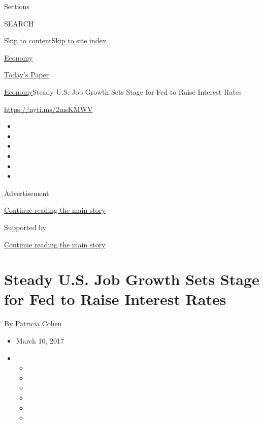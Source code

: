 Sections

SEARCH

\protect\hyperlink{site-content}{Skip to
content}\protect\hyperlink{site-index}{Skip to site index}

\href{https://www.nytimes.com/section/business/economy}{Economy}

\href{https://myaccount.nytimes.com/auth/login?response_type=cookie\&client_id=vi}{}

\href{https://www.nytimes.com/section/todayspaper}{Today's Paper}

\href{/section/business/economy}{Economy}\textbar{}Steady U.S. Job
Growth Sets Stage for Fed to Raise Interest Rates

\url{https://nyti.ms/2msKMWV}

\begin{itemize}
\item
\item
\item
\item
\item
\item
\end{itemize}

Advertisement

\protect\hyperlink{after-top}{Continue reading the main story}

Supported by

\protect\hyperlink{after-sponsor}{Continue reading the main story}

\hypertarget{steady-us-job-growth-sets-stage-for-fed-to-raise-interest-rates}{%
\section{Steady U.S. Job Growth Sets Stage for Fed to Raise Interest
Rates}\label{steady-us-job-growth-sets-stage-for-fed-to-raise-interest-rates}}

By \href{http://www.nytimes.com/by/patricia-cohen}{Patricia Cohen}

\begin{itemize}
\item
  March 10, 2017
\item
  \begin{itemize}
  \item
  \item
  \item
  \item
  \item
  \item
  \end{itemize}
\end{itemize}

